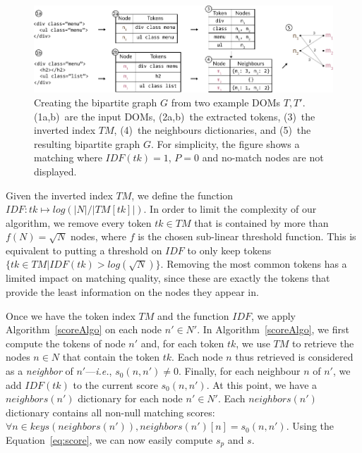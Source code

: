 \begin{figure}
    \centering
    \includegraphics[width=\linewidth]{tree-matching/explanation/inverted_index}
    \caption{Creating the bipartite graph $G$ from two example DOMs $T,T'$. (1a,b)~are the input DOMs, (2a,b)~the extracted tokens, (3)~the inverted index $TM$, (4)~the neighbours dictionaries, and (5)~the resulting bipartite graph $G$. For simplicity, the figure shows a matching where $IDF(tk)=1$, $P=0$ and no-match nodes are not displayed.}\label{fig:inverted_index}
\end{figure}

Given the inverted index $TM$, we define the function $IDF: tk \mapsto log(|N|/|TM[tk]|)$.
In order to limit the complexity of our algorithm, we remove every token $tk \in TM$ that is contained by more than $f(N)=\sqrt{N}$ nodes, where $f$ is the chosen sub-linear threshold function.
This is equivalent to putting a threshold on $IDF$ to only keep tokens $\{tk \in TM |IDF(tk) > log(\sqrt{N})\}$.
Removing the most common tokens has a limited impact on matching quality, since these are exactly the tokens that provide the least information on the nodes they appear in.


Once we have the token index $TM$ and the function $IDF$, we apply Algorithm~\ref{scoreAlgo} on each node $n' \in N'$.
In Algorithm~\ref{scoreAlgo}, we first compute the tokens of node $n'$ and, for each token $tk$, we use $TM$ to retrieve the nodes $n \in N$ that contain the token $tk$.
Each node $n$ thus retrieved is considered as a \textit{neighbor} of $n'$---\emph{i.e.}, $s_0(n,n') \neq 0$.
Finally, for each neighbour $n$ of $n'$, we add $IDF(tk)$ to the current score $s_0(n,n')$.
At this point, we have a $neighbors(n')$ dictionary for each node $n' \in N'$.
Each $neighbors(n')$ dictionary contains all non-null matching scores: $\forall n \in keys(neighbors(n')), neighbors(n')[n] = s_0(n,n')$.
Using the Equation~\ref{eq:score}, we can now easily compute $s_{p}$ and $s$.

